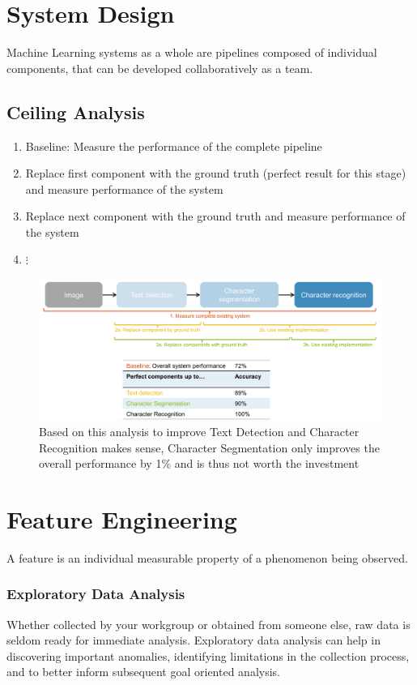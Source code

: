 \documentclass[11pt]{article}
\theoremstyle{definition}
\begin{document}
\section{System Design}
Machine Learning systems as a whole are pipelines composed of individual components, that can be developed collaboratively as a team.

\subsection{Ceiling Analysis}
\begin{enumerate}
	\item {\color{Tomato2} Baseline}: Measure the performance of the complete pipeline
	\item Replace {\color{Goldenrod1} first component} with the ground truth (perfect result for this stage) and measure performance of the system
	\item Replace {\color{OliveDrab3} next component} with the ground truth and measure performance of the system
	\item \qquad $\vdots$
\end{enumerate}
\begin{figure}[H]
	\centering
	\includegraphics[width=\linewidth]{img/ceiling_analysis.png}
	\caption{Based on this analysis to improve Text Detection and Character Recognition makes sense, Character Segmentation only improves the overall performance by 1\% and is thus not worth the investment}
\end{figure}

\section{Feature Engineering}
A feature is an individual measurable property of a phenomenon being observed.

\subsubsection{Exploratory Data Analysis}
Whether collected by your workgroup or obtained from someone else, raw data is seldom ready for immediate analysis. Exploratory data analysis can help in discovering important anomalies, identifying limitations in the collection process, and to better inform subsequent goal oriented analysis.
\end{document}
